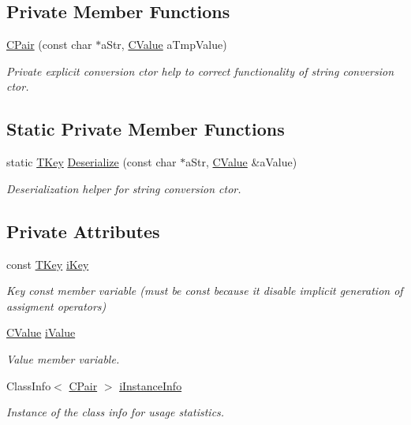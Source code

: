 \subsection*{Private Member Functions}
\begin{DoxyCompactItemize}
\item 
\hyperlink{class_c_pair_a0f94617ac6e7649aa0259587b6863361}{C\+Pair} (const char $\ast$a\+Str, \hyperlink{class_c_value___t_student_1_1_c_value}{C\+Value} a\+Tmp\+Value)
\begin{DoxyCompactList}\small\item\em Private explicit conversion c\textquotesingle{}tor help to correct functionality of string conversion c\textquotesingle{}tor. \end{DoxyCompactList}\end{DoxyCompactItemize}
\subsection*{Static Private Member Functions}
\begin{DoxyCompactItemize}
\item 
static \hyperlink{class_c_pair_a9030f3ef2a07301c105bdf17620ae66a}{T\+Key} \hyperlink{class_c_pair_a2df810bdb2486d5b6b68d8c830d73f9c}{Deserialize} (const char $\ast$a\+Str, \hyperlink{class_c_value___t_student_1_1_c_value}{C\+Value} \&a\+Value)
\begin{DoxyCompactList}\small\item\em Deserialization helper for string conversion c\textquotesingle{}tor. \end{DoxyCompactList}\end{DoxyCompactItemize}
\subsection*{Private Attributes}
\begin{DoxyCompactItemize}
\item 
const \hyperlink{class_c_pair_a9030f3ef2a07301c105bdf17620ae66a}{T\+Key} \hyperlink{class_c_pair_a37d0dd4585094709d0536f47453a2a38}{i\+Key}
\begin{DoxyCompactList}\small\item\em Key const member variable (must be const because it disable implicit generation of assigment operators) \end{DoxyCompactList}\item 
\hyperlink{class_c_value___t_student_1_1_c_value}{C\+Value} \hyperlink{class_c_pair_a469ab54768d718dd0072d8878fd44611}{i\+Value}
\begin{DoxyCompactList}\small\item\em Value member variable. \end{DoxyCompactList}\item 
Class\+Info$<$ \hyperlink{class_c_pair}{C\+Pair} $>$ \hyperlink{class_c_pair_a749ff9db1acff63d75aa09ec87d2427a}{i\+Instance\+Info}
\begin{DoxyCompactList}\small\item\em Instance of the class info for usage statistics. \end{DoxyCompactList}\end{DoxyCompactItemize}
